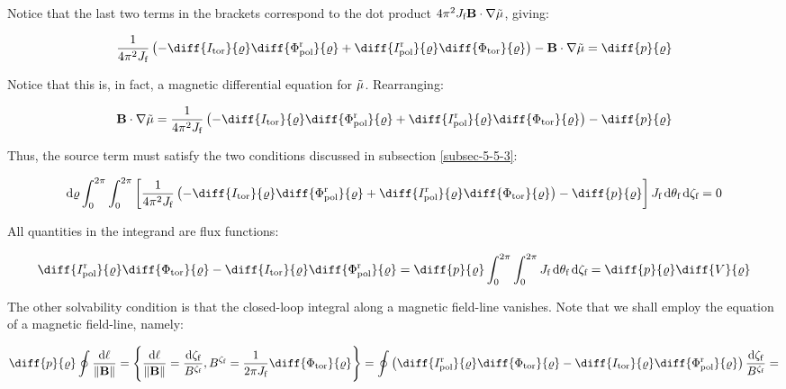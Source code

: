 Notice that the last two terms in the brackets correspond to the dot product $4\pi^2J_\text{f}\mathbf{B}\cdot\nabla\Tilde{\mu}$, giving:

\begin{equation}
    \frac{1}{4\pi^2J_\text{f}}\left(-\diff{I_\text{tor}}{\varrho}\diff{\Phi_\text{pol}^\text{r}}{\varrho}+\diff{I_\text{pol}^\text{r}}{\varrho}\diff{\Phi_\text{tor}}{\varrho}\right)-\mathbf{B}\cdot\nabla\Tilde{\mu}=\diff{p}{\varrho}
\end{equation}

Notice that this is, in fact, a magnetic differential equation for $\Tilde{\mu}$. Rearranging:

\begin{equation}
    \mathbf{B}\cdot\nabla\Tilde{\mu}=\frac{1}{4\pi^2J_\text{f}}\left(-\diff{I_\text{tor}}{\varrho}\diff{\Phi_\text{pol}^\text{r}}{\varrho}+\diff{I_\text{pol}^\text{r}}{\varrho}\diff{\Phi_\text{tor}}{\varrho}\right)-\diff{p}{\varrho}
\end{equation}

Thus, the source term must satisfy the two conditions discussed in subsection \ref{subsec-5-5-3}:

\begin{equation}
    \mathrm{d}\varrho\int_0^{2\pi}\int_0^{2\pi}\left[\frac{1}{4\pi^2J_\text{f}}\left(-\diff{I_\text{tor}}{\varrho}\diff{\Phi_\text{pol}^\text{r}}{\varrho}+\diff{I_\text{pol}^\text{r}}{\varrho}\diff{\Phi_\text{tor}}{\varrho}\right)-\diff{p}{\varrho}\right]J_\text{f}\,\mathrm{d}\theta_\text{f}\,\mathrm{d}\zeta_\text{f}=0
\end{equation}

All quantities in the integrand are flux functions:

\begin{equation}
    \label{eq-5-92}
    \diff{I_\text{pol}^\text{r}}{\varrho}\diff{\Phi_\text{tor}}{\varrho}-\diff{I_\text{tor}}{\varrho}\diff{\Phi_\text{pol}^\text{r}}{\varrho}=\diff{p}{\varrho}\int_0^{2\pi}\int_0^{2\pi}J_\text{f}\,\mathrm{d}\theta_\text{f}\,\mathrm{d}\zeta_\text{f}=\diff{p}{\varrho}\diff{V}{\varrho}
\end{equation}

The other solvability condition is that the closed-loop integral along a magnetic field-line vanishes. Note that we shall employ the equation of a magnetic field-line, namely:

\begin{equation}
    \diff{p}{\varrho}\oint\frac{\mathrm{d}\ell}{\|\mathbf{B}\|}=\Bigg\{\frac{\mathrm{d}\ell}{\|\mathbf{B}\|}=\frac{\mathrm{d}\zeta_\text{f}}{B^{\zeta_\text{f}}}, B^{\zeta_\text{f}}=\frac{1}{2\pi J_\text{f}}\diff{\Phi_\text{tor}}{\varrho}\Bigg\}=\oint\left(\diff{I_\text{pol}^\text{r}}{\varrho}\diff{\Phi_\text{tor}}{\varrho}-\diff{I_\text{tor}}{\varrho}\diff{\Phi_\text{pol}^\text{r}}{\varrho}\right)\frac{\mathrm{d}\zeta_\text{f}}{B^{\zeta_\text{f}}}=
\end{equation}

